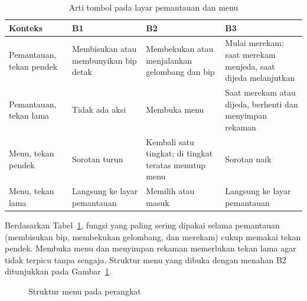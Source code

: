 \begin{table}[!ht]
  \centering
  \caption{Arti tombol pada layar pemantauan dan menu}
  \label{tab:peta-tombol}
  \setlength{\tabcolsep}{4pt}
  \renewcommand{\arraystretch}{1.15}
  \small
  \begin{tabular}{>{\RaggedRight\arraybackslash}p{2.4cm}>{\RaggedRight\arraybackslash}p{3.1cm}>{\RaggedRight\arraybackslash}p{3.1cm}>{\RaggedRight\arraybackslash}p{3.8cm}}
    \toprule
    \textbf{Konteks} & \textbf{B1} & \textbf{B2} & \textbf{B3} \\
    \midrule
    Pemantauan, tekan pendek & Membisukan atau membunyikan bip detak & Membekukan atau menjalankan gelombang dan bip & Mulai merekam; saat merekam menjeda, saat dijeda melanjutkan \\
    Pemantauan, tekan lama & Tidak ada aksi & Membuka menu & Saat merekam atau dijeda, berhenti dan menyimpan rekaman \\
    Menu, tekan pendek & Sorotan turun & Kembali satu tingkat; di tingkat teratas menutup menu & Sorotan naik \\
    Menu, tekan lama & Langsung ke layar pemantauan & Memilih atau masuk & Langsung ke layar pemantauan \\
    \bottomrule
  \end{tabular}
\end{table}

Berdasarkan Tabel~\ref{tab:peta-tombol}, fungsi yang paling sering dipakai selama pemantauan (membisukan bip, membekukan gelombang, dan merekam) cukup memakai tekan pendek. Membuka menu dan menyimpan rekaman memerlukan tekan lama agar tidak terpicu tanpa sengaja. Struktur menu yang dibuka dengan menahan B2 ditunjukkan pada Gambar~\ref{fig:3-pohon-menu}.

\begin{figure}[!ht]
  \centering
  \caption{Struktur menu pada perangkat}
  \label{fig:3-pohon-menu}
\end{figure}

